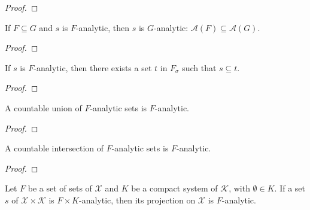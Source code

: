 \begin{proof}\leanok

\end{proof}


\begin{lemma}\label{lem:IsPavingAnalytic.mono}
  \leanok
If $F \subseteq G$ and $s$ is $F$-analytic, then $s$ is $G$-analytic: $\mathcal{A}(F) \subseteq \mathcal{A}(G)$.
\end{lemma}

\begin{proof}\leanok

\end{proof}


\begin{lemma}\label{lem:IsPavingAnalytic.exists_mem_countableSupClosure_superset}
  \leanok
If $s$ is $F$-analytic, then there exists a set $t$ in $F_\sigma$ such that $s \subseteq t$.
\end{lemma}

\begin{proof}\leanok

\end{proof}


\begin{lemma}\label{lem:IsPavingAnalytic.iUnion}
A countable union of $F$-analytic sets is $F$-analytic.
\end{lemma}

\begin{proof}  

\end{proof}


\begin{lemma}\label{lem:IsPavingAnalytic.iInter}
A countable intersection of $F$-analytic sets is $F$-analytic.
\end{lemma}

\begin{proof}  

\end{proof}


\begin{lemma}\label{lem:IsPavingAnalytic.fst}
  \leanok
Let $F$ be a set of sets of $\mathcal{X}$ and $K$ be a compact system of $\mathcal{K}$, with $\emptyset \in K$.
If a set $s$ of $\mathcal{X} \times \mathcal{K}$ is $F \times K$-analytic, then its projection on $\mathcal{X}$ is $F$-analytic.
\end{lemma}

